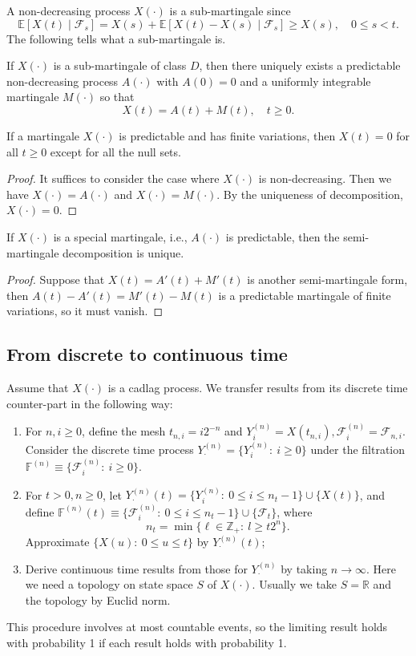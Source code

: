 A non-decreasing process $X(\cdot)$ is a sub-martingale since
\[
\mathbb{E}[X(t)\mid\mathcal{F}_s] = X(s) + \mathbb{E}[X(t)-X(s)\mid\mathcal{F}_s]\ge X(s),\quad 0\le s<t.
\]
The following tells what a sub-martingale is.

\begin{theorem}
If $X(\cdot)$ is a sub-martingale of class $D$, then there uniquely exists a predictable non-decreasing process $A(\cdot)$ with $A(0)=0$ and a uniformly integrable martingale $M(\cdot)$ so that
\[
X(t) = A(t) + M(t),\quad t\ge0.
\]
\end{theorem}
\begin{proposition}
If a martingale $X(\cdot)$ is predictable and has finite variations, then $X(t)=0$ for all $t\ge0$ except for all the null sets.
\end{proposition}
\begin{proof}
It suffices to consider the case where $X(\cdot)$ is non-decreasing.
Then we have $X(\cdot)=A(\cdot)$ and $X(\cdot)=M(\cdot)$.
By the  uniqueness of decomposition, $X(\cdot)=0$.
\end{proof}

\begin{theorem}
If $X(\cdot)$ is a special martingale, i.e., $A(\cdot)$ is predictable, then the semi-martingale decomposition is unique.
\end{theorem}
\begin{proof}
Suppose that $X(t)=A'(t)+M'(t)$ is another semi-martingale form, then $A(t)-A'(t)=M'(t)-M(t)$ is a predictable martingale of finite variations, so it must vanish.
\end{proof}

\subsection{From discrete to continuous time}
Assume that $X(\cdot)$ is a cadlag process. We transfer results from its discrete time counter-part in the following way:
\begin{enumerate}
\item
For $n,i\ge0$, define the mesh $t_{n,i}=i2^{-n}$ and $Y_i^{(n)}=X(t_{n,i}), \mathcal{F}_i^{(n)}=\mathcal{F}_{n,i}$. Consider the discrete time process $Y_{\cdot}^{(n)}=\{Y_i^{(n)}:~i\ge0\}$ under the filtration 
$\mathbb{F}^{(n)}\equiv\{\mathcal{F}_i^{(n)}:~i\ge0\}$.
\item
For $t>0, n\ge0$, let $Y_{\cdot}^{(n)}(t)=\{Y_i^{(n)}:~0\le i\le n_t-1\}\cup\{X(t)\}$, and define 
$\mathbb{F}^{(n)}(t)\equiv\{\mathcal{F}_i^{(n)}:~0\le i\le n_t-1\}\cup\{\mathcal{F}_t\}$,
where 
\[
n_t=\min\{\ell\in\mathbb{Z}_+:~l\ge t2^n\}.
\]
Approximate $\{X(u):~0\le u\le t\}$ by $Y_{\cdot}^{(n)}(t)$;
\item
Derive continuous time results from those for $Y_{\cdot}^{(n)}$ by taking $n\to\infty$.
Here we need a topology on state space $S$ of $X(\cdot)$.
Usually we take $S=\mathbb{R}$ and the topology by Euclid norm.
\end{enumerate}
This procedure involves at most countable events, so the limiting result holds with probability 1 if 
each result holds with probability 1.

